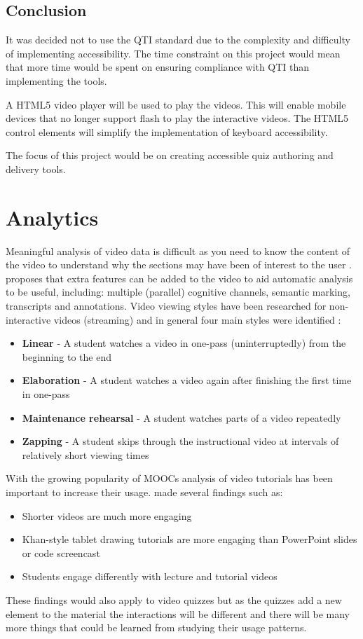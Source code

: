 \subsection*{Conclusion}
\label{Subsection: eAssessment Conclusion}
It was decided not to use the \gls{QTI} standard due to the complexity and difficulty of implementing accessibility. The time constraint on this project would mean that more time would be spent on ensuring compliance with \gls{QTI} than implementing the tools.

A HTML5 video player will be used to play the videos. This will enable mobile devices that no longer support flash to play the interactive videos. The HTML5 control elements will simplify the implementation of keyboard accessibility.

The focus of this project would be on creating accessible quiz authoring and delivery tools.

\section{Analytics}
\label{Section:Analytics}
Meaningful analysis of video data is difficult as you need to know the content of the video to understand why the sections may have been of interest to the user \citep{videoLectures}.  proposes that extra features can be added to the video to aid automatic analysis to be useful, including: multiple (parallel) cognitive channels, semantic marking, transcripts and annotations. Video viewing styles have been researched for non-interactive videos (streaming) and in general four main styles were identified \citep{DeBoer}:
\begin{itemize}
\item \textbf{Linear} - A student watches a video in one-pass (uninterruptedly) from the beginning to the end
\item \textbf{Elaboration} - A student watches a video again after finishing the first time in one-pass
\item \textbf{Maintenance rehearsal} - A student watches parts of a video repeatedly
\item \textbf{Zapping} - A student skips through the instructional video at intervals of relatively short viewing times
\end{itemize}

With the growing popularity of \glspl{MOOC} analysis of video tutorials has been important to increase their usage.  made several findings such as:
\begin{itemize}
\item Shorter videos are much more engaging
\item Khan-style tablet drawing tutorials are more engaging than PowerPoint slides or code screencast
\item Students engage differently with lecture and tutorial videos
\end{itemize}
These findings would also apply to video quizzes but as the quizzes add a new element to the material the interactions will be different and there will be many more things that could be learned from studying their usage patterns.

